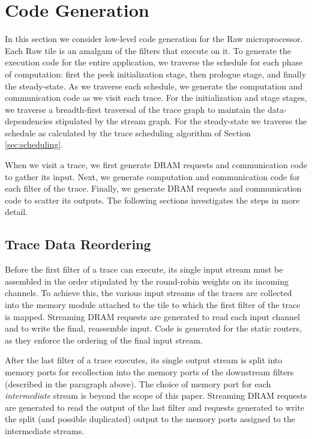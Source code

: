 \section{Code Generation}
\label{sec:codegen}
In this section we consider low-level code generation for the Raw
microprocessor. Each Raw tile is an amalgam of the filters that
execute on it. To generate the execution code for the entire
application, we traverse the schedule for each phase of computation:
first the peek initialization stage, then prologue stage, and finally
the steady-state.  As we traverse each schedule, we generate the
computation and communication code as we visit each trace.  For the
initialization and stage stages, we traverse a breadth-first traversal
of the trace graph to maintain the data-dependencies stipulated by the
stream graph. For the steady-state we traverse the schedule as
calculated by the trace scheduling algorithm of Section
\ref{sec:scheduling}.

When we visit a trace, we first generate DRAM requests and
communication code to gather its input.  Next, we generate
computation and communication code for each filter of the trace.
Finally, we generate DRAM requests and communication code to scatter
its outputs.  The following sections investigates the steps
in more detail.

\subsection{Trace Data Reordering}
Before the first filter of a trace can execute, its single input
stream must be assembled in the order stipulated by the round-robin
weights on its incoming channels. To achieve this, the various input
streams of the traces are collected into the memory module attached to
the tile to which the first filter of the trace is mapped. Streaming
DRAM requests are generated to read each input channel and to write
the final, reassemble input.  Code is generated for the static
routers, as they enforce the ordering of the final input stream.

After the last filter of a trace executes, its single output stream is
split into memory ports for recollection into the memory ports of the
downstream filters (described in the paragraph above). The choice of
memory port for each {\it intermediate} stream is beyond the scope
of this paper. Streaming DRAM requests are generated to read
the output of the last filter and requests generated to write the
split (and possible duplicated) output to the memory ports assigned to
the intermediate streams.

